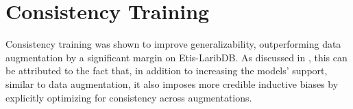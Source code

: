 \section{Consistency Training}
Consistency training was shown to improve generalizability, outperforming data augmentation by a significant margin on Etis-LaribDB. As discussed in , this can be attributed to the fact that, in addition to increasing the models' support, similar to data augmentation, it also imposes more credible inductive biases by explicitly optimizing for consistency across augmentations. 




